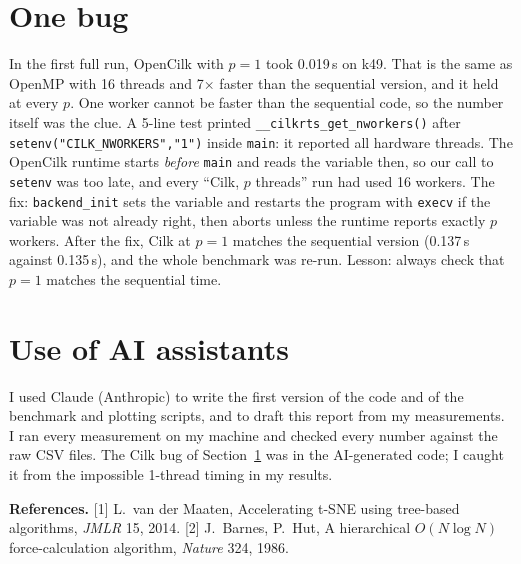 \documentclass[11pt,a4paper]{article}
\newcommand{\code}[1]{\texttt{#1}}
\begin{document}
\section{One bug}\label{sec:bug}
In the first full run, OpenCilk with $p=1$ took 0.019\,s on k49. That is the same as OpenMP with 16 threads and 7$\times$ faster than the sequential version, and it held at every $p$. One worker cannot be faster than the sequential code, so the number itself was the clue.
A 5-line test printed \code{\_\_cilkrts\_get\_nworkers()} after \code{setenv("CILK\_NWORKERS","1")} inside \code{main}: it reported all hardware threads.
The OpenCilk runtime starts \emph{before} \code{main} and reads the variable then, so our call to \code{setenv} was too late, and every ``Cilk, $p$ threads'' run had used 16 workers.
The fix: \code{backend\_init} sets the variable and restarts the program with \code{execv} if the variable was not already right, then aborts unless the runtime reports exactly $p$ workers.
After the fix, Cilk at $p=1$ matches the sequential version (0.137\,s against 0.135\,s), and the whole benchmark was re-run. Lesson: always check that $p=1$ matches the sequential time.

\section{Use of AI assistants}
I used Claude (Anthropic) to write the first version of the code and of the benchmark and plotting scripts, and to draft this report from my measurements.
I ran every measurement on my machine and checked every number against the raw CSV files. The Cilk bug of Section~\ref{sec:bug} was in the AI-generated code; I caught it from the impossible 1-thread timing in my results.

\small
\noindent\textbf{References.}
[1] L.~van der Maaten, Accelerating t-SNE using tree-based algorithms, \emph{JMLR} 15, 2014.
[2] J.~Barnes, P.~Hut, A hierarchical $O(N\log N)$ force-calculation algorithm, \emph{Nature} 324, 1986.
\end{document}
